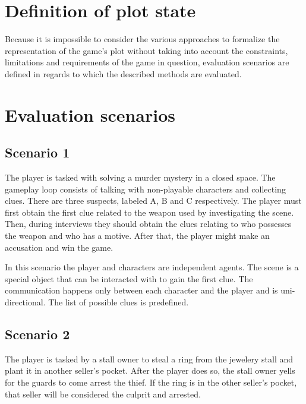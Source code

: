 
\section{Definition of plot state}

Because it is impossible to consider the various approaches to formalize the representation of the game's plot without taking into account the constraints, limitations and requirements of the game in question, evaluation scenarios are defined in regards to which the described methods are evaluated.


\section{Evaluation scenarios}

\subsection{Scenario 1}

The player is tasked with solving a murder mystery in a closed space.
The gameplay loop consists of talking with non-playable characters and collecting clues.
There are three suspects, labeled A, B and C respectively.
The player must first obtain the first clue related to the weapon used by investigating the scene.
Then, during interviews they should obtain the clues relating to who possesses the weapon and who has a motive.
After that, the player might make an accusation and win the game.

In this scenario the player and characters are independent agents.
The scene is a special object that can be interacted with to gain the first clue.
The communication happens only between each character and the player and is uni-directional.
The list of possible clues is predefined.

\subsection{Scenario 2}

The player is tasked by a stall owner to steal a ring from the jewelery stall and plant it in another seller's pocket.
After the player does so, the stall owner yells for the guards to come arrest the thief.
If the ring is in the other seller's pocket, that seller will be considered the culprit and arrested.

